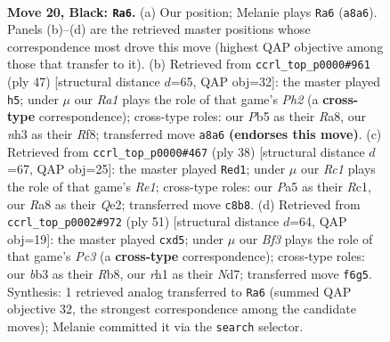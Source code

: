 \documentclass[11pt]{article}
\begin{document}
\clearpage

\begin{figure}[p]\centering
\begin{subfigure}{0.46\textwidth}\centering
\resizebox{\linewidth}{!}{%
\newchessgame
\chessboard[
  setfen={r1r3k1/1bqn1p1p/5bp1/pppPp1B1/4P3/1BP3PN/P3KP1P/R1Q4R b - - 5 20},
  showmover=false,
  pgfstyle=straightmove, color=movearrow, markmove={a8-a6}
]}
\caption{}
\end{subfigure}\hfill
\begin{subfigure}{0.46\textwidth}\centering
\resizebox{\linewidth}{!}{%
\newchessgame
\chessboard[
  setfen={r4rk1/p1p1q1bp/1p1p2b1/3Ppnp1/1PP1B3/P1N2PB1/6PP/R2QR1K1 b - - 0 24},
  showmover=false,
  pgfstyle=straightmove, color=movearrow, markmove={h7-h5}
]}
\caption{}
\end{subfigure}
\\[4pt]
\begin{subfigure}{0.46\textwidth}\centering
\resizebox{\linewidth}{!}{%
\newchessgame
\chessboard[
  setfen={1r1qr1k1/1pp2pb1/p2pb1p1/4n2p/P1P1PB2/1PN3PP/4QPB1/2R1R1K1 w - - 2 20},
  showmover=false,
  pgfstyle=straightmove, color=movearrow, markmove={e1-d1}
]}
\caption{}
\end{subfigure}\hfill
\begin{subfigure}{0.46\textwidth}\centering
\resizebox{\linewidth}{!}{%
\newchessgame
\chessboard[
  setfen={1rr3k1/2qnbp1p/b1pp2p1/p2Pp3/2P1P1P1/4B3/P1BN1PP1/2RQR1K1 b - - 0 26},
  showmover=false,
  pgfstyle=straightmove, color=movearrow, markmove={c6-d5}
]}
\caption{}
\end{subfigure}
\caption{\textbf{Move 20, Black: \texttt{Ra6}.} (a) Our position; Melanie plays \texttt{Ra6} (\texttt{a8a6}). Panels (b)--(d) are the retrieved master positions whose correspondence most drove this move (highest QAP objective among those that transfer to it). (b) Retrieved from \texttt{ccrl\_top\_p0000\#961} (ply 47) [structural distance $d$=65, QAP obj=32]: the master played \texttt{h5}; under $\mu$ our \emph{Ra1} plays the role of that game's \emph{Ph2} (a \textbf{cross-type} correspondence); cross-type roles: our \emph{P}b5 as their \emph{R}a8, our \emph{n}h3 as their \emph{R}f8; transferred move \texttt{a8a6} \textbf{(endorses this move)}. (c) Retrieved from \texttt{ccrl\_top\_p0000\#467} (ply 38) [structural distance $d$=67, QAP obj=25]: the master played \texttt{Red1}; under $\mu$ our \emph{Rc1} plays the role of that game's \emph{Re1}; cross-type roles: our \emph{P}a5 as their \emph{R}c1, our \emph{R}a8 as their \emph{Q}e2; transferred move \texttt{c8b8}. (d) Retrieved from \texttt{ccrl\_top\_p0002\#972} (ply 51) [structural distance $d$=64, QAP obj=19]: the master played \texttt{cxd5}; under $\mu$ our \emph{Bf3} plays the role of that game's \emph{Pc3} (a \textbf{cross-type} correspondence); cross-type roles: our \emph{b}b3 as their \emph{R}b8, our \emph{r}h1 as their \emph{N}d7; transferred move \texttt{f6g5}. Synthesis: 1 retrieved analog transferred to \texttt{Ra6} (summed QAP objective 32, the strongest correspondence among the candidate moves); Melanie committed it via the \texttt{search} selector.}
\label{fig:thought-m39}
\end{figure}
\end{document}

